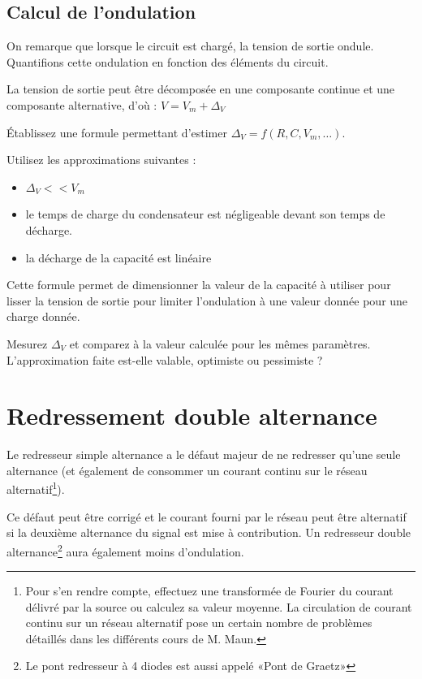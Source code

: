 \documentclass{../template/labo}
\begin{document}
\subsection{Calcul de l'ondulation}
On remarque que lorsque le circuit est chargé, la tension de sortie ondule. Quantifions cette ondulation en fonction des éléments du circuit.

La tension de sortie peut être décomposée en une composante continue et une composante alternative, d'où : $V=V_m+\Delta_V$

\Question
{
	Établissez une formule permettant d'estimer $\Delta_V=f(R,C, V_m,\dots)$. %
	
	Utilisez les approximations suivantes :
	\begin{itemize}
	\item $\Delta_V<<V_m$
	\item le temps de charge du condensateur est négligeable devant son temps de décharge.
	\item la décharge de la capacité est linéaire
	\end{itemize}
}
{}%
	\label{Q:14}


Cette formule permet de dimensionner la valeur de la capacité à utiliser pour lisser la tension de sortie pour limiter l'ondulation à une valeur donnée pour une charge donnée.

\Question
{
	Mesurez $\Delta_V$ et comparez à la valeur calculée pour les mêmes paramètres. L'approximation faite est-elle valable, optimiste ou pessimiste ?
}
{}%
	\label{Q:15}

\newpage
\section{Redressement double alternance}
Le redresseur simple alternance a le défaut majeur de ne redresser qu'une seule alternance (et également de consommer un courant continu sur le réseau alternatif\footnote{Pour s'en rendre compte, effectuez une transformée de Fourier du courant délivré par la source ou calculez sa valeur moyenne. La circulation de courant continu sur un réseau alternatif pose un certain nombre de problèmes détaillés dans les différents cours de M. Maun.}).

Ce défaut peut être corrigé et le courant fourni par le réseau peut être alternatif si la deuxième alternance du signal est mise à contribution. Un redresseur double alternance\footnote{Le pont redresseur à 4 diodes est aussi appelé «Pont de Graetz»}  aura également moins d'ondulation.
\end{document}
